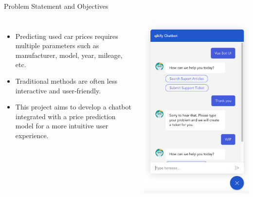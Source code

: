 \documentclass{beamer}
\begin{document}
\begin{frame}[t]{Problem Statement and Objectives}
    \begin{columns}
        \begin{itemize}
        \item Predicting used car prices requires multiple parameters such as manufacturer, model, year, mileage, etc.
        \item Traditional methods are often less interactive and user-friendly.
        \item This project aims to develop a chatbot integrated with a price prediction model for a more intuitive user experience.
        \end{itemize}
        
        \centering
        \includegraphics[width=\linewidth]{interface.png}  %
    \end{columns}
\end{frame}
\end{document}
